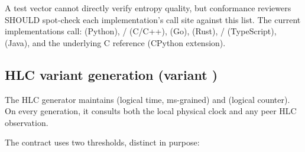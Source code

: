 \noindent A test vector cannot directly verify entropy quality, but conformance reviewers SHOULD spot-check each implementation's call site against this list. The current implementations call:  (Python), / (C/C++),  (Go),  (Rust), / (TypeScript),  (Java), and the underlying C reference (CPython extension).

\subsection{HLC variant generation (variant )}

The HLC generator maintains  (logical time, ms-grained) and  (logical counter). On every generation, it consults both the local physical clock and any peer HLC observation.

The contract uses two thresholds, distinct in purpose:

